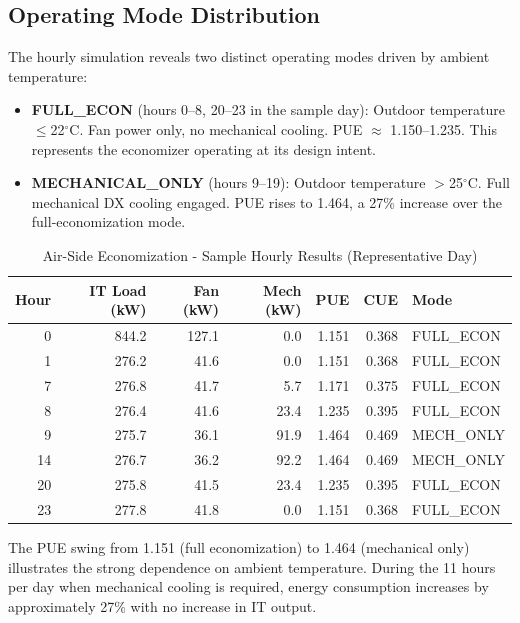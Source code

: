 ﻿\documentclass[12pt,a4paper]{report}
\newcommand{\degC}{$^{\circ}$C}
\begin{document}
\subsection{Operating Mode Distribution}

The hourly simulation reveals two distinct operating modes driven by ambient temperature:

\begin{itemize}[noitemsep]
  \item \textbf{FULL\_ECON} (hours 0--8, 20--23 in the sample day): Outdoor temperature
        $\leq$22\degC. Fan power only, no mechanical cooling. PUE $\approx$ 1.150--1.235.
        This represents the economizer operating at its design intent.
  \item \textbf{MECHANICAL\_ONLY} (hours 9--19): Outdoor temperature $>$25\degC. Full
        mechanical DX cooling engaged. PUE rises to 1.464, a 27\% increase over the
        full-economization mode.
\end{itemize}

\begin{table}[H]
\centering
\caption{Air-Side Economization - Sample Hourly Results (Representative Day)}
\label{tab:air_hourly}
\renewcommand{\arraystretch}{1.25}
\begin{tabular}{rrrrrrl}
\toprule
\textbf{Hour} & \textbf{IT Load (kW)} & \textbf{Fan (kW)} & \textbf{Mech (kW)} & \textbf{PUE} & \textbf{CUE} & \textbf{Mode} \\
\midrule
0  & 844.2 & 127.1 & 0.0  & 1.151 & 0.368 & FULL\_ECON \\
1  & 276.2 & 41.6  & 0.0  & 1.151 & 0.368 & FULL\_ECON \\
7  & 276.8 & 41.7  & 5.7  & 1.171 & 0.375 & FULL\_ECON \\
8  & 276.4 & 41.6  & 23.4 & 1.235 & 0.395 & FULL\_ECON \\
9  & 275.7 & 36.1  & 91.9 & 1.464 & 0.469 & MECH\_ONLY \\
14 & 276.7 & 36.2  & 92.2 & 1.464 & 0.469 & MECH\_ONLY \\
20 & 275.8 & 41.5  & 23.4 & 1.235 & 0.395 & FULL\_ECON \\
23 & 277.8 & 41.8  & 0.0  & 1.151 & 0.368 & FULL\_ECON \\
\bottomrule
\end{tabular}
\end{table}

\noindent The PUE swing from 1.151 (full economization) to 1.464 (mechanical only) illustrates
the strong dependence on ambient temperature. During the 11 hours per day when mechanical
cooling is required, energy consumption increases by approximately 27\% with no increase
in IT output.
\end{document}
